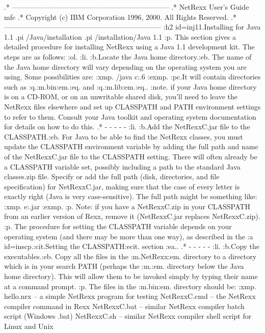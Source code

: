 .* ------------------------------------------------------------------
.* NetRexx User's Guide                                              mfc
.* Copyright (c) IBM Corporation 1996, 2000.  All Rights Reserved.
.* ------------------------------------------------------------------
:h2 id=inj11.Installing for Java 1.1
.pi /Java/installation
.pi /installation/Java 1.1
:p.
This section gives a detailed procedure for installing NetRexx using a
Java 1.1 development kit.  The steps are as follows:
:ol.
:li.
:b.Locate the Java home directory.:eb.
The name of the Java home directory will vary depending on the operating
system you are using.  Some possibilities are:
:xmp.
/java
c:.6
:exmp.
:pc.It will contain directories such as :q.:m.bin:em.:eq. and
:q.:m.lib:em.:eq..
:note. if your Java home directory is on a CD-ROM, or on an unwritable
shared disk, you'll need to leave the NetRexx files elsewhere and set up
CLASSPATH and PATH environment settings to refer to them.
Consult your Java toolkit and operating system documentation for details
on how to do this.
.* - - - - -
:li.
:b.Add the NetRexxC.jar file to the CLASSPATH.:eb.
For Java to be able to find the NetRexx classes, you must update the
CLASSPATH environment variable by adding the full path and name of the
NetRexxC.jar file to the CLASSPATH setting.  There will often already be
a CLASSPATH variable set, possibly including a path to the standard Java
classes.zip file.  Specify or add the full path (disk, directories, and
file specification) for NetRexxC.jar, making sure that the case of every
letter is exactly right (Java is very case-sensitive).  The
full path might be something like:
:xmp.
e:\NetRexx\lib\NetRexxC.jar
:exmp.
:p.
Note: if you have a NetRexxC.zip in your CLASSPATH from an earlier
version of Rexx, remove it (NetRexxC.jar replaces NetRexxC.zip).
:p.
The procedure for setting the CLASSPATH variable depends on your
operating system (and there may be more than one way), as described in
the :a id=inscp.:cit.Setting the CLASSPATH:ecit. section :ea..
.* - - - - -
:li.
:b.Copy the executables.:eb.
Copy all the files in the :m.NetRexx\bin:em. directory to a directory
which is in your search PATH (perhaps the :m.\bin:em. directory below
the Java home directory).  This will allow them to be invoked simply by
typing their name at a command prompt.
:p.
The files in the :m.bin:em. directory should be:
:xmp.
hello.nrx    -- a simple NetRexx program for testing
NetRexxC.cmd -- the NetRexx compiler command in Rexx
NetRexxC.bat -- similar NetRexx compiler batch script (Windows .bat)
NetRexxC.sh  -- similar NetRexx compiler shell script for Linux and Unix
